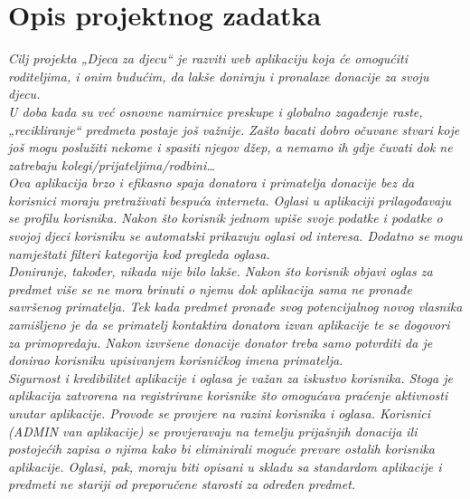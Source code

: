 \chapter{Opis projektnog zadatka}
		
		
		\textit{Cilj projekta „Djeca za djecu“ je razviti web aplikaciju koja će omogućiti roditeljima, i onim budućim, da lakše doniraju i pronalaze donacije za svoju djecu. }\\
		\textit{U doba kada su već osnovne namirnice preskupe i globalno zagađenje raste, „recikliranje“ predmeta postaje još važnije. Zašto bacati dobro očuvane stvari koje još mogu poslužiti nekome i spasiti njegov džep, a nemamo ih gdje čuvati dok ne zatrebaju kolegi/prijateljima/rodbini…  }\\
		\newline
		\textit{Ova aplikacija brzo i efikasno spaja donatora i primatelja donacije bez da korisnici moraju pretraživati bespuća interneta. Oglasi u aplikaciji prilagođavaju se profilu korisnika. Nakon što korisnik jednom upiše svoje podatke i podatke o svojoj djeci korisniku se automatski prikazuju oglasi od interesa. Dodatno se mogu namještati filteri kategorija kod pregleda oglasa. }\\
		\textit{Doniranje, također, nikada nije bilo lakše. Nakon što korisnik objavi oglas za predmet više se ne mora brinuti o njemu dok aplikacija sama ne pronađe savršenog primatelja. Tek kada predmet pronađe svog potencijalnog novog vlasnika zamišljeno je da se primatelj kontaktira donatora izvan aplikacije te se dogovori za primopredaju. \color{red} Nakon izvršene donacije donator treba samo potvrditi da je donirao korisniku upisivanjem korisničkog imena primatelja.}\\
		\newline
		\textit{Sigurnost i kredibilitet aplikacije i oglasa je važan za iskustvo korisnika. Stoga je aplikacija zatvorena na registrirane korisnike što omogućava praćenje aktivnosti unutar aplikacije. Provode se provjere na razini korisnika i oglasa. Korisnici \color{red}(ADMIN van aplikacije) \color{black}se provjeravaju na temelju prijašnjih donacija ili postojećih zapisa o njima kako bi eliminirali moguće prevare ostalih korisnika aplikacije. Oglasi, pak, moraju biti opisani u skladu sa standardom aplikacije i \color{red}predmeti ne stariji od preporučene starosti za određen predmet. }
		\newline

